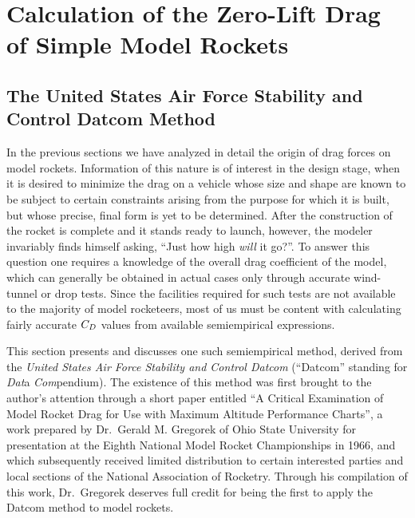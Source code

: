 \section{Calculation of the Zero-Lift Drag of Simple Model Rockets}\label{ch3:sec:6}

\subsection{The United States Air Force Stability and Control Datcom Method}\label{ch3:sec:6.1}

In the previous sections we have analyzed in detail the origin of drag forces
on model rockets. Information of this nature is of interest in the design
stage, when it is desired to minimize the drag on a vehicle whose size and
shape are known to be subject to certain constraints arising from the purpose
for which it is built, but whose precise, final form is yet to be determined.
After the construction of the rocket is complete and it stands ready to
launch, however, the modeler invariably finds himself asking, ``Just how high
\emph{will} it go?''. To answer this question one requires a knowledge of the
overall drag coefficient of the model, which can generally be obtained in
actual cases only through accurate wind-tunnel or drop tests. Since the
facilities required for such tests are not available to the majority of model
rocketeers, most of us must be content with calculating fairly accurate $C_{D}$
values from available semiempirical expressions.

This section presents and discusses one such semiempirical method, derived
from the \emph{United States Air Force Stability and Control Datcom}
(``Datcom'' standing for \emph{Dat}a \emph{Com}pendium). The existence of this
method was first brought to the author's attention through a short paper
entitled ``A Critical Examination of Model Rocket Drag for Use with Maximum
Altitude Performance Charts'', a work prepared by Dr.\ Gerald M. Gregorek of
Ohio State University for presentation at the Eighth National Model Rocket
Championships in 1966, and which subsequently received limited distribution
to certain interested parties and local sections of the National Association
of Rocketry. Through his compilation of this work, Dr.\ Gregorek deserves full
credit for being the first to apply the Datcom method to model rockets.

